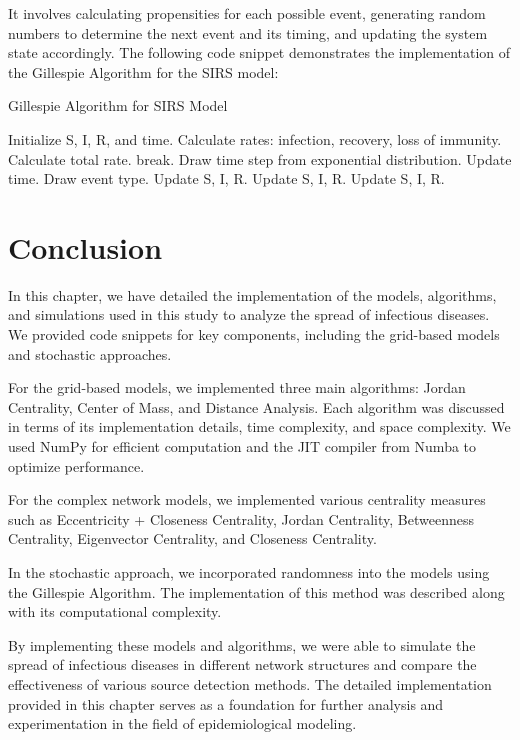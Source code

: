 It involves calculating propensities for each possible event, generating random numbers to determine the next event and its timing, and updating the system state accordingly. The following code snippet demonstrates the implementation of the Gillespie Algorithm for the SIRS model:

\begin{algorithm}
\caption{Gillespie Algorithm for SIRS Model}
\begin{algorithmic}[1]
\STATE Initialize S, I, R, and time.
    \STATE Calculate rates: infection, recovery, loss of immunity.
    \STATE Calculate total rate.
        \STATE break.
    \ENDIF
    \STATE Draw time step from exponential distribution.
    \STATE Update time.
    \STATE Draw event type.
        \STATE Update S, I, R.
        \STATE Update S, I, R.
        \STATE Update S, I, R.
    \ENDIF
\ENDWHILE
\end{algorithmic}
\end{algorithm}

\section{Conclusion}
In this chapter, we have detailed the implementation of the models, algorithms, and simulations used in this study to analyze the spread of infectious diseases. We provided code snippets for key components, including the grid-based models and stochastic approaches. 

For the grid-based models, we implemented three main algorithms: Jordan Centrality, Center of Mass, and Distance Analysis. Each algorithm was discussed in terms of its implementation details, time complexity, and space complexity. We used NumPy for efficient computation and the JIT compiler from Numba to optimize performance.

For the complex network models, we implemented various centrality measures such as Eccentricity + Closeness Centrality, Jordan Centrality, Betweenness Centrality, Eigenvector Centrality, and Closeness Centrality.

In the stochastic approach, we incorporated randomness into the models using the Gillespie Algorithm. The implementation of this method was described along with its computational complexity.

By implementing these models and algorithms, we were able to simulate the spread of infectious diseases in different network structures and compare the effectiveness of various source detection methods. The detailed implementation provided in this chapter serves as a foundation for further analysis and experimentation in the field of epidemiological modeling.